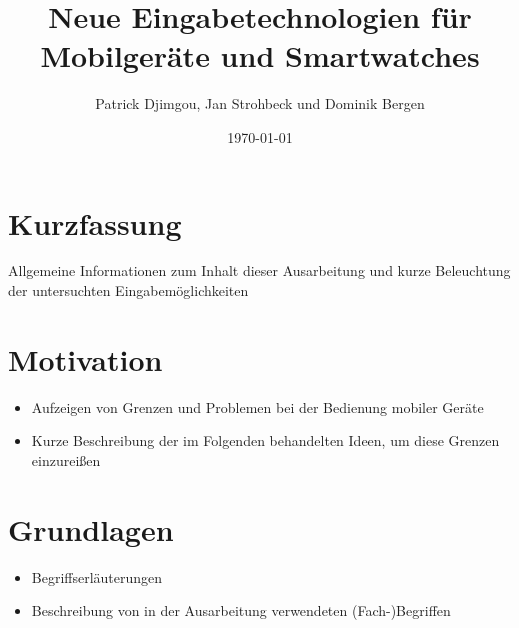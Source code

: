 \documentclass[oneside]{elaboration}
\begin{document}
\author{Patrick Djimgou, Jan Strohbeck und Dominik Bergen}
\title{\textbf{Neue Eingabetechnologien für Mobilgeräte und Smartwatches}}
\date{\today}

\maketitle
\newpage


\chapter*{Kurzfassung}
Allgemeine Informationen zum Inhalt dieser Ausarbeitung und kurze Beleuchtung der untersuchten Eingabemöglichkeiten


\tableofcontents
\newpage

\setcounter{page}{1}


\listoffigures
{}
\newpage


\listoftables
{}
\newpage

\setcounter{page}{1}


\chapter{Motivation}\label{Motivation}
\begin{itemize}
\item Aufzeigen von Grenzen und Problemen bei der Bedienung mobiler Geräte
\item Kurze Beschreibung der im Folgenden behandelten Ideen, um diese Grenzen einzureißen
\end{itemize}


\chapter{Grundlagen}\label{Grundlagen}
\begin{itemize}
\item Begriffserläuterungen
\item Beschreibung von in der Ausarbeitung verwendeten (Fach-)Begriffen
\end{itemize}
\end{document}
